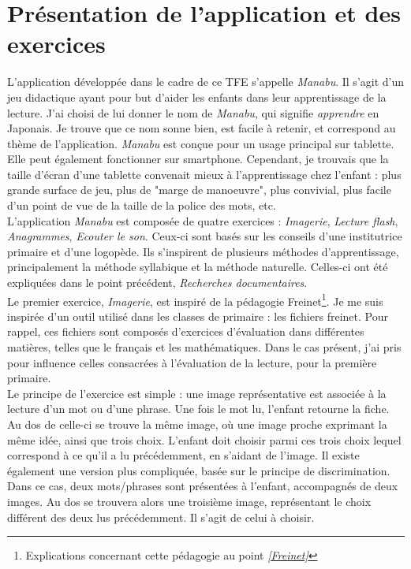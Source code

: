 \section{Présentation de l'application et des exercices}
L'application développée dans le cadre de ce TFE s'appelle \textit{Manabu}. Il s'agit d'un jeu didactique ayant pour but d'aider les enfants dans leur apprentissage de la lecture. J'ai choisi de lui donner le nom de \textit{Manabu}, qui signifie \textit{apprendre} en Japonais. Je trouve que ce nom sonne bien, est facile à retenir, et correspond au thème de l'application. 
\textit{Manabu} est conçue pour un usage principal sur tablette. Elle peut également fonctionner sur smartphone. Cependant, je trouvais que la taille d'écran d'une tablette convenait mieux à l'apprentissage chez l'enfant : plus grande surface de jeu, plus de "marge de manoeuvre", plus convivial, plus facile d'un point de vue de la taille de la police des mots, etc.\\

L'application \textit{Manabu} est composée de quatre exercices : \textit{Imagerie}, \textit{Lecture flash}, \textit{Anagrammes}, \textit{Ecouter le son}. Ceux-ci sont basés sur les conseils d'une institutrice primaire et d'une logopède. Ils s'inspirent de plusieurs méthodes d'apprentissage, principalement la méthode syllabique et  la méthode naturelle. Celles-ci ont été expliquées dans le point précédent, \textit{Recherches documentaires}.\\

Le premier exercice, \textit{Imagerie}, est inspiré de la pédagogie Freinet\footnote{Explications concernant cette pédagogie au point \textit{\ref{Freinet}}}. Je me suis inspirée d'un outil utilisé dans les classes de primaire : les fichiers freinet. Pour rappel, ces fichiers sont composés d'exercices d'évaluation dans différentes matières, telles que le français et les mathématiques. Dans le cas présent, j'ai pris pour influence celles consacrées à l'évaluation de la lecture, pour la première primaire.\\

Le principe de l'exercice est simple : une image représentative est associée à la lecture d'un mot ou d'une phrase. Une fois le mot lu, l'enfant retourne la fiche. Au dos de celle-ci se trouve la même image, où une image proche exprimant la même idée, ainsi que trois choix. L'enfant doit choisir parmi ces trois choix lequel correspond à ce qu'il a lu précédemment, en s'aidant de l'image. Il existe également une version plus compliquée, basée sur le principe de discrimination. Dans ce cas, deux mots/phrases sont présentées à l'enfant, accompagnés de deux images. Au dos se trouvera alors une troisième image, représentant le choix différent des deux lus précédemment. Il s'agit de celui à choisir.\\

